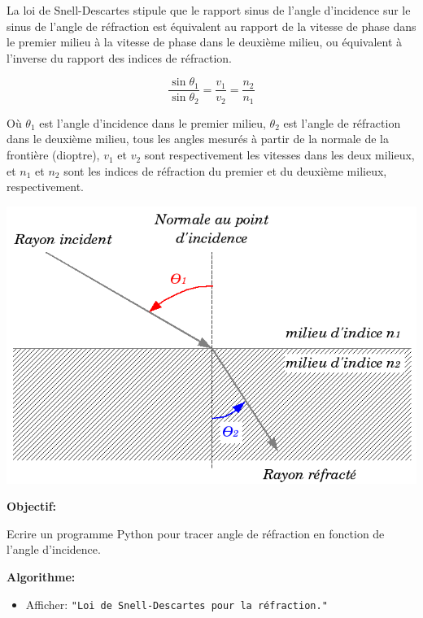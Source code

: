\documentclass[%
oneside,                 %
final,                   %
10pt,french]{article}
\newenvironment{doconceexercise}{}{}
\newcounter{doconceexercisecounter}
\begin{document}
\begin{doconceexercise}



La loi de Snell-Descartes stipule que le rapport sinus de l'angle d'incidence sur le sinus de l'angle de réfraction est équivalent au rapport de la vitesse de phase dans le premier milieu à la vitesse de phase dans le deuxième milieu, ou équivalent à l'inverse du rapport des indices de réfraction.

$$\dfrac{\sin\theta_1}{\sin\theta_2} = \dfrac{v_1}{v_2} = \dfrac{n_2}{n_1}$$

Où $\theta_1$ est l'angle d'incidence dans le premier milieu, $\theta_2$ est l'angle de réfraction dans le deuxième milieu, tous les angles mesurés à partir de la normale de la frontière (dioptre), $v_1$ et $v_2$ sont respectivement les vitesses dans les deux milieux, et $n_1$ et $n_2$ sont les indices de réfraction du premier et du deuxième milieux, respectivement.



\vspace{6mm}

\centerline{\includegraphics[width=0.7\linewidth]{figs/Refraction_fr.png}}

\vspace{6mm}



\textbf{Objectif:}

Ecrire un programme Python pour tracer angle de réfraction en fonction de l'angle d'incidence.

\textbf{Algorithme:}
\begin{itemize}
 \item Afficher: \texttt{"Loi de Snell-Descartes pour la réfraction."}


\end{itemize}
\end{doconceexercise}
\end{document}
